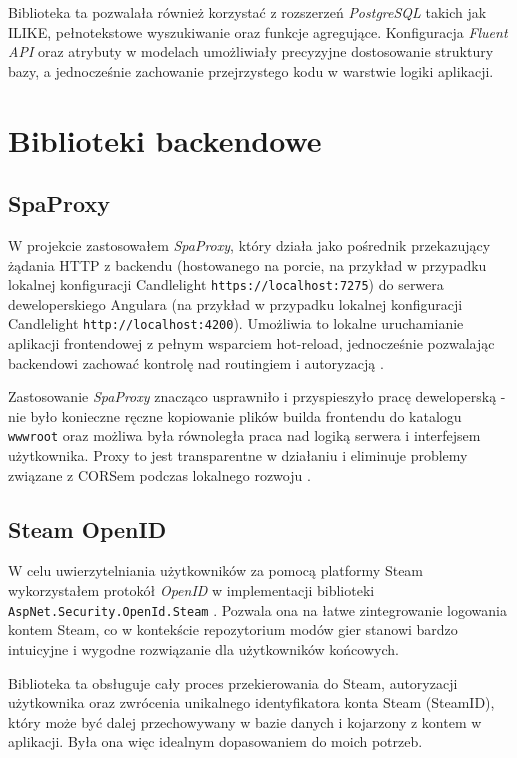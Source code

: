\documentclass[a4paper,twoside,12pt]{book}
\begin{document}
Biblioteka ta pozwalała również korzystać z rozszerzeń \textit{PostgreSQL} takich jak ILIKE, pełnotekstowe wyszukiwanie oraz funkcje agregujące. Konfiguracja \textit{Fluent API} oraz atrybuty w modelach umożliwiały precyzyjne dostosowanie struktury bazy, a jednocześnie zachowanie przejrzystego kodu w warstwie logiki aplikacji.

\section{Biblioteki backendowe}

\subsection{SpaProxy}
W projekcie zastosowałem \textit{SpaProxy}, który działa jako pośrednik przekazujący żądania HTTP z backendu (hostowanego na porcie, na przykład w przypadku lokalnej konfiguracji Candlelight \texttt{https://localhost:7275}) do serwera deweloperskiego Angulara (na przykład w przypadku lokalnej konfiguracji Candlelight \texttt{http://localhost:4200}). Umożliwia to lokalne uruchamianie aplikacji frontendowej z pełnym wsparciem hot-reload, jednocześnie pozwalając backendowi zachować kontrolę nad routingiem i autoryzacją \cite{aspnetspaproxy2025}.

Zastosowanie \textit{SpaProxy} znacząco usprawniło i przyspieszyło pracę deweloperską - nie było konieczne ręczne kopiowanie plików builda frontendu do katalogu \texttt{wwwroot} oraz możliwa była równoległa praca nad logiką serwera i interfejsem użytkownika. Proxy to jest transparentne w działaniu i eliminuje problemy związane z CORSem podczas lokalnego rozwoju \cite{spaproxy2025}.

\subsection{Steam OpenID}
W celu uwierzytelniania użytkowników za pomocą platformy Steam wykorzystałem protokół \textit{OpenID} w implementacji biblioteki \texttt{AspNet.Security.OpenId.Steam} \cite{steamopenid2025}. Pozwala ona na łatwe zintegrowanie logowania kontem Steam, co w kontekście repozytorium modów gier stanowi bardzo intuicyjne i wygodne rozwiązanie dla użytkowników końcowych.

Biblioteka ta obsługuje cały proces przekierowania do Steam, autoryzacji użytkownika oraz zwrócenia unikalnego identyfikatora konta Steam (SteamID), który może być dalej przechowywany w bazie danych i kojarzony z kontem w aplikacji. Była ona więc idealnym dopasowaniem do moich potrzeb.
\end{document}
